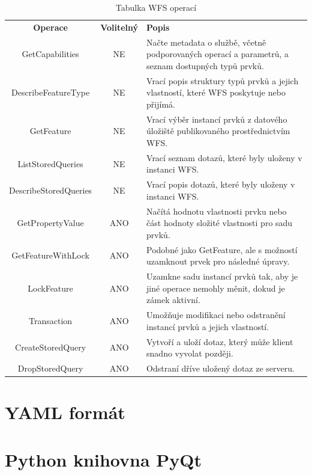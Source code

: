 \documentclass[a4paper,oneside,12pt]{book}
\begin{document}
\begin{table}[htbp]
  \centering
  \caption{Tabulka WFS operací} 
  \label{tab:WFS}
  \begin{tabular}{|c|c|p{7cm}|}
    \hline
    \textbf{Operace} & \textbf{Volitelný} & \textbf{Popis} \\
    \hhline{=|=|=}
    GetCapabilities & NE & Načte metadata o službě, včetně podporovaných operací a parametrů, a seznam dostupných typů prvků. \\
    \hline
    DescribeFeatureType & NE & Vrací popis struktury typů prvků a jejich vlastností, které WFS poskytuje nebo přijímá. \\
    \hline
    GetFeature & NE & Vrací výběr instancí prvků z datového úložiště publikovaného prostřednictvím WFS. \\
    \hline
    ListStoredQueries & NE & Vrací seznam dotazů, které byly uloženy v instanci WFS. \\
    \hline
    DescribeStoredQueries & NE & Vrací popis dotazů, které byly uloženy v instanci WFS. \\
    \hline
    GetPropertyValue & ANO & Načítá hodnotu vlastnosti prvku nebo část hodnoty složité vlastnosti pro sadu prvků. \\
    \hline
    GetFeatureWithLock & ANO & Podobné jako GetFeature, ale s možností uzamknout prvek pro následné úpravy. \\
    \hline
    LockFeature & ANO & Uzamkne sadu instancí prvků tak, aby je jiné operace nemohly měnit, dokud je zámek aktivní. \\
    \hline
    Transaction & ANO & Umožňuje modifikaci nebo odstranění instancí prvků a jejich vlastností. \\
    \hline
    CreateStoredQuery & ANO & Vytvoří a uloží dotaz, který může klient snadno vyvolat později. \\
    \hline
    DropStoredQuery & ANO & Odstraní dříve uložený dotaz ze serveru. \\
    \hline
  \end{tabular}
\end{table}

\section{YAML formát} \label{yaml}

\section{Python knihovna PyQt} \label{pyqt}
\end{document}
